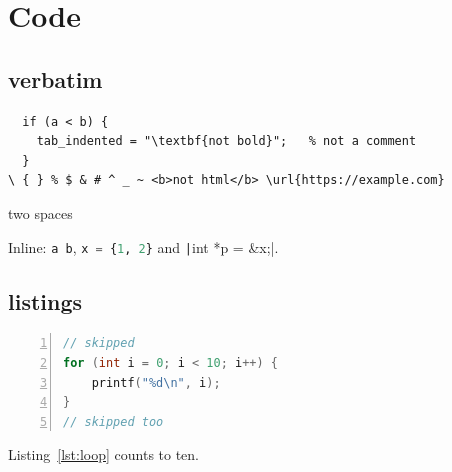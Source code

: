 \section{Code}
\label{sec:code}
\lstset{basicstyle=\ttfamily\small, breaklines=true, frame=single}

\subsection{verbatim}
\begin{verbatim}
  if (a < b) {
	tab_indented = "\textbf{not bold}";   % not a comment
  }
\ { } % $ & # ^ _ ~ <b>not html</b> \url{https://example.com}
\end{verbatim}
\begin{verbatim*}
two  spaces
\end{verbatim*}
Inline: \verb*|a b|, \lstinline[language=Python]|x = {1, 2}| and \texttt|int *p = &x;|.

\subsection{listings}
\begin{lstlisting}[language=C, caption={A loop in C}, label=lst:loop, numbers=left, firstline=2, lastline=4]
// skipped
for (int i = 0; i < 10; i++) {
    printf("%d\n", i);
}
// skipped too
\end{lstlisting}
Listing~\ref{lst:loop} counts to ten.




